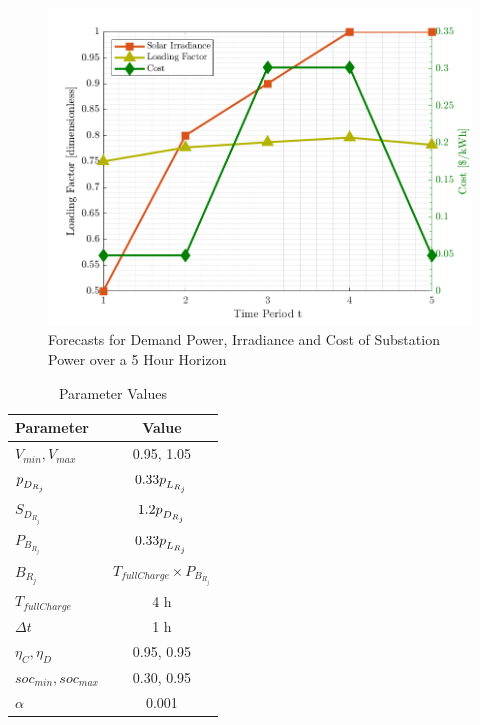 \documentclass[../../outputs/main.tex]{subfiles}
\begin{document}
\begin{figure}[h!]
    \centering
    \includegraphics[height=0.25\textheight]{../figures/T5-inputCurves/InputCurves_Horizon_5.png}
    \caption{Forecasts for Demand Power, Irradiance and Cost of Substation Power over a 5 Hour Horizon}
    \label{fig:inputCurve-5}
\end{figure}

\def\ds{\rule{0pt}{1.5ex}} %

\begin{table}[h!]
    \centering
    \caption{Parameter Values}
    \begin{tabular}{|l|c|}
    \hline
    \textbf{Parameter} & \textbf{Value} \\ \hline
    $V_{min}, V_{max}$ & 0.95, 1.05 \\ \hline
    $p_{\ds D_{R_j}}$ & $0.33 p_{\ds L_{R_j}}$ \\ \hline
    $S_{D_{R_j}}$ & $1.2 p_{\ds D_{R_j}}$ \\ \hline
    $P_{B_{R_j}}$ & $0.33 p_{\ds L_{R_j}}$ \\ \hline
    $B_{R_j}$ & $T_{fullCharge} \times P_{B_{R_j}}$ \\ \hline
    $T_{fullCharge}$ & 4 h \\ \hline
    $\Delta t$ & 1 h \\ \hline
    $\eta_C, \eta_D$ & 0.95, 0.95 \\ \hline
    $soc_{min}, soc_{max}$ & 0.30, 0.95 \\ \hline
    $\alpha$ & 0.001 \\ \hline
    \end{tabular}
    \label{table:parameter-values}
\end{table}
\end{document}

